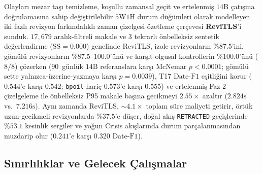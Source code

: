 ﻿\documentclass[journal]{IEEEtran}
\begin{document}
Olaylar{\i} mezar ta\c{s}{\i} temizleme, ko\c{s}ullu zamansal ge\c{c}it ve ertelenmi\c{s} $14\text{B}$ \c{c}at{\i}\c{s}ma do\u{g}rulamas{\i}na sahip de\u{g}i\c{s}tirilebilir $5\text{W}1\text{H}$ durum d\"{u}\u{g}\"{u}mleri olarak modelleyen iki fazl{\i} revizyon fark{\i}ndal{\i}kl{\i} zaman \c{c}izelgesi \"{o}zetleme \c{c}erçevesi \textbf{ReviTLS}'i sunduk. $17{,}679$ aral{\i}k-filtreli makale ve $3$ tekrarl{\i} \"{o}nbelleksiz sentetik de\u{g}erlendirme ($\text{SS}=0.000$) genelinde ReviTLS, izole revizyonlar{\i}n $\%87.5$'ini, g\"{o}m\"{u}l\"{u} revizyonlar{\i}n $\%87.5\text{--}100.0$'\"{u}n\"{u} ve kar\c{s}{\i}t-olgusal kontrollerin $\%100.0$'\"{u}n\"{u} ($8/8$) \c{c}\"{o}zerken ($90$~g\"{u}nl\"{u}k $14\text{B}$ referanslara kar\c{s}{\i} McNemar $p < 0.0001$; g\"{o}m\"{u}l\"{u} sette yaln{\i}zca-\"{u}zerine-yazmaya kar\c{s}{\i} $p = 0.0039$), T17 $\text{Date-F1}$ e\c{s}itli\u{g}ini korur ($0.544$'e kar\c{s}{\i} $0.542$; \texttt{bpoil} hari\c{c} $0.573$'e kar\c{s}{\i} $0.555$) ve ertelenmi\c{s} Faz-2 \c{c}izelgeleme ile \"{o}nbelleksiz P95 makale ba\c{s}{\i}na gecikmeyi $2.55\times$ azalt{\i}r ($2.824\text{s}$ vs.\ $7.216\text{s}$). Ayn{\i} zamanda ReviTLS, $\sim 4.1\times$ toplam s\"{u}re maliyeti getirir, \"{o}rt\"{u}k uzun-gecikmeli revizyonlarda $\%37.5$'e d\"{u}\c{s}er, do\u{g}al ak{\i}\c{s} \texttt{RETRACTED} ge\c{c}i\c{s}lerinde $\%53.1$ kesinlik sergiler ve yo\u{g}un Crisis ak{\i}\c{s}lar{\i}nda durum par\c{c}alanmas{\i}ndan muzdarip olur ($0.241$'e kar\c{s}{\i} $0.320$ $\text{Date-F1}$).

\subsection{S{\i}n{\i}rl{\i}l{\i}klar ve Gelecek \c{C}al{\i}\c{s}malar}
\label{subsec:limitations}
\end{document}
